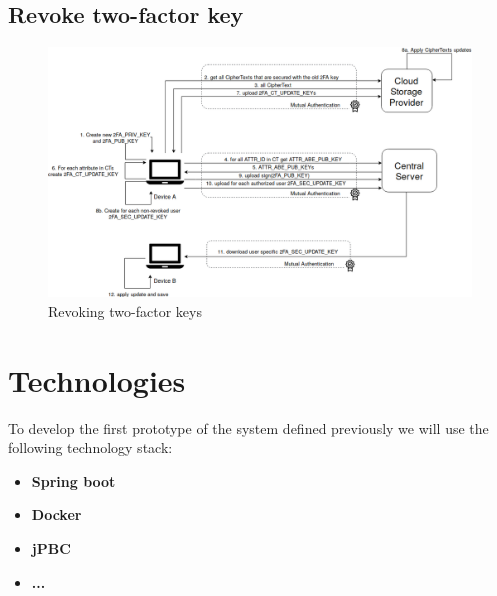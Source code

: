 \subsection{Revoke two-factor key}
\begin{figure}[!t]
\centering
    \includegraphics[width=1.0\linewidth]{img/2FA_revoke.png}
    \caption{Revoking two-factor keys}
    \label{fig:tfdacmacs-2FA-revokation}
\end{figure}




\section{Technologies}
To develop the first prototype of the system defined previously we will use the following technology stack:

\begin{itemize}
  \item \textbf{Spring boot}
  \item \textbf{Docker}
  \item \textbf{jPBC} \cite{ISCC:DecIov11}
  \item \textbf{...}
\end{itemize}

